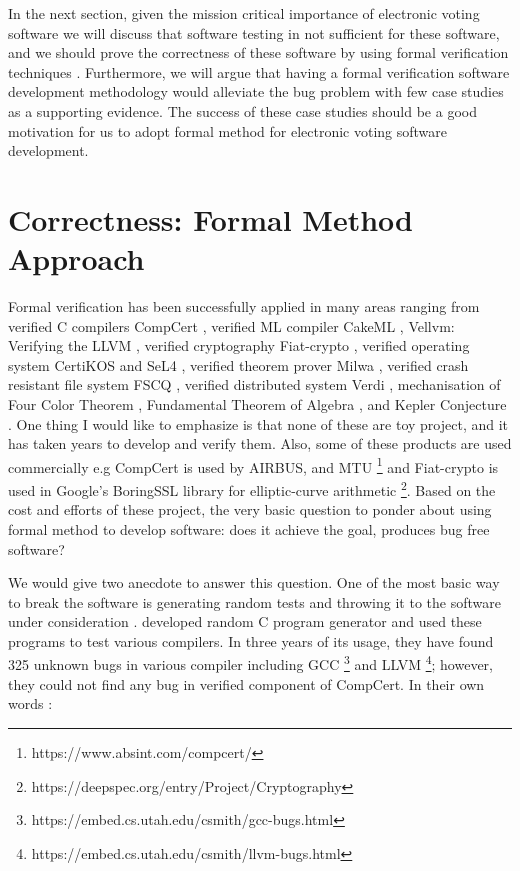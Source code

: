   In the next section, given the mission critical importance of electronic voting software 
   we will discuss that software testing 
   in not sufficient for these software,  and we should 
   prove the  correctness of these software
   by using formal verification techniques \citep{BECKERT2014115}.
   Furthermore, we will argue that  having a formal verification software development methodology would alleviate 
	the bug problem with few case studies as a supporting evidence. The success of these 
	case studies should be a good motivation for us to 
	adopt formal method for electronic voting software development. 
   
   
   \section{Correctness: Formal Method Approach}
   \label{sec:correctness_formal}

	Formal verification has been successfully applied in many areas ranging 
	from verified C compilers CompCert \citep{DBLP:conf/popl/Leroy06}, verified ML compiler
	CakeML \citep{Kumar:2014:CVI}, Vellvm: Verifying the LLVM 
	\citep{10.1007/978-3-642-35308-6_6}, verified cryptography 
	Fiat-crypto \citep{DBLP:conf/sp/ErbsenPGSC19}, verified 
	operating system CertiKOS \citep{DBLP:conf/apsys/GuVFSC11} and 
	SeL4 \citep{DBLP:conf/sosp/KleinEHACDEEKNSTW09}, verified theorem 
	prover Milwa \citep{DBLP:conf/itp/MyreenD14}, 
	verified crash resistant file system FSCQ \citep{Chen:2015:UCH:2815400.2815402}, 
	verified distributed system 
	Verdi \citep{DBLP:conf/pldi/WilcoxWPTWEA15}, mechanisation of 
	Four Color Theorem \citep{10.1007/978-3-540-87827-8_28}, 
	Fundamental Theorem of 
	Algebra \citep{10.1007/3-540-45842-5_7}, and Kepler Conjecture \citep{hales-kepler}.
	One thing I would like to emphasize 
	is that none of these are toy project, and it has taken years 
	to develop and verify them. Also, some of these products 
	are used commercially e.g CompCert is used by AIRBUS, and MTU
	\footnote{https://www.absint.com/compcert/} and Fiat-crypto is used 
	in Google's BoringSSL library for elliptic-curve arithmetic 
	\footnote{https://deepspec.org/entry/Project/Cryptography}. 
	Based on the cost and efforts of these project, 
	the very basic question to ponder about using formal method to develop 
	software:  does it achieve the goal, produces bug free software?
	
	
	We would give two anecdote to answer this question. 
	One of the most basic way to 
	break the software is generating random tests and throwing it to 
	the software under consideration \citep{Miller:1990:ESR:96267.96279}.
	\citep{Yang:2011:FUB:1993316.1993532} developed random 
	C program generator and used these programs to test various 
	compilers. In three years of its usage, they have found 325 unknown
	bugs in various compiler including GCC
	\footnote{https://embed.cs.utah.edu/csmith/gcc-bugs.html} and LLVM
	\footnote{https://embed.cs.utah.edu/csmith/llvm-bugs.html}; however, 
	they could not find any bug in verified component of CompCert. 
	In their own words \citep{Yang:2011:FUB:1993316.1993532}:
	
